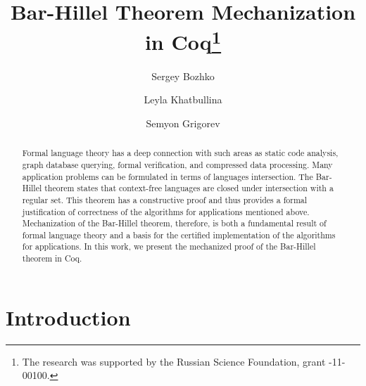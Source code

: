 \documentclass[runningheads]{llncs}
\begin{document}
%
\title{Bar-Hillel Theorem Mechanization in Coq\thanks{The research was supported by the Russian Science Foundation, grant -11-00100.}}
%
%
\author{Sergey Bozhko \and
Leyla Khatbullina \and
Semyon Grigorev}
%
%
%
\maketitle              %
%
\begin{abstract}
Formal language theory has a deep connection with such areas as static code analysis, graph database querying, formal verification, and compressed data processing.
Many application problems can be formulated in terms of languages intersection.
The Bar-Hillel theorem states that context-free languages are closed under intersection with a regular set.
This theorem has a constructive proof and thus provides a formal justification of correctness of the algorithms for applications mentioned above.
Mechanization of the Bar-Hillel theorem, therefore, is both a fundamental result of formal language theory and a basis for the certified implementation of the algorithms for applications.
In this work, we present the mechanized proof of the Bar-Hillel theorem in Coq.

\end{abstract}
%
%
%
\section{Introduction}
\end{document}
